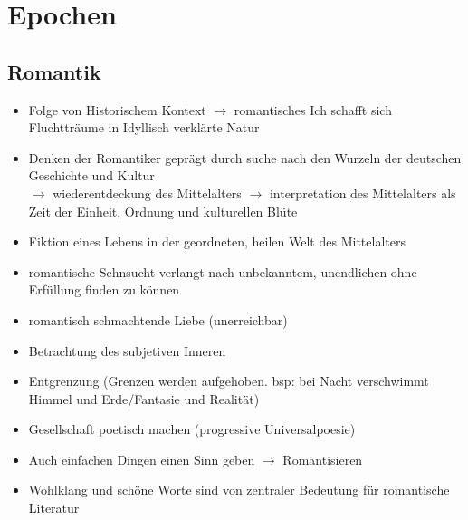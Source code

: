 

%
%

\section{Epochen}

\subsection{Romantik}

\begin{itemize}
    \item Folge von Historischem Kontext $\rightarrow$ romantisches Ich schafft sich Fluchtträume in Idyllisch verklärte Natur
    \item Denken der Romantiker geprägt durch suche nach den Wurzeln der deutschen Geschichte und Kultur \\ 
        $\rightarrow$ wiederentdeckung des Mittelalters
        $\rightarrow$ interpretation des Mittelalters als Zeit der Einheit, Ordnung und kulturellen Blüte
    \item Fiktion eines Lebens in der geordneten, heilen Welt des Mittelalters
    \item romantische Sehnsucht verlangt nach unbekanntem, unendlichen ohne Erfüllung finden zu können
    \item romantisch schmachtende Liebe (unerreichbar)
    \item Betrachtung des subjetiven Inneren
    \item Entgrenzung (Grenzen werden aufgehoben. bsp: bei Nacht verschwimmt Himmel und Erde/Fantasie und Realität)
    \item Gesellschaft poetisch machen (progressive Universalpoesie)
    \item Auch einfachen Dingen einen Sinn geben $\rightarrow$ Romantisieren
    \item Wohlklang und schöne Worte sind von zentraler Bedeutung für romantische Literatur
\end{itemize}

